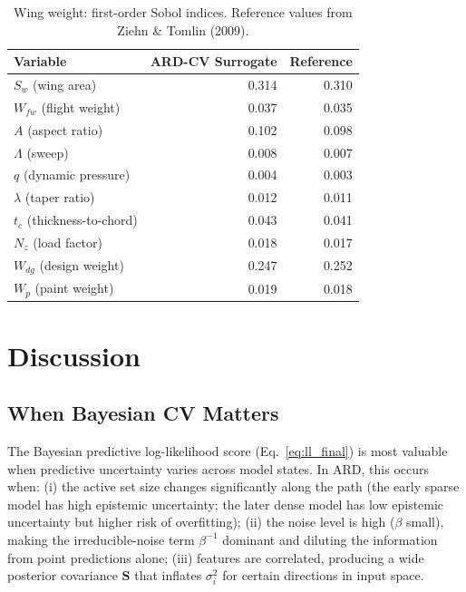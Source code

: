 \documentclass[11pt,a4paper]{article}
\begin{document}
\begin{table}[H]
\centering
\caption{Wing weight: first-order Sobol indices. Reference values from Ziehn \& Tomlin (2009).}
\label{tab:wing_sobol}
\begin{tabular}{@{}lrr@{}}
\toprule
Variable & ARD-CV Surrogate & Reference \\
\midrule
$S_w$ (wing area) & 0.314 & 0.310 \\
$W_{fw}$ (flight weight) & 0.037 & 0.035 \\
$A$ (aspect ratio) & 0.102 & 0.098 \\
$\Lambda$ (sweep) & 0.008 & 0.007 \\
$q$ (dynamic pressure) & 0.004 & 0.003 \\
$\lambda$ (taper ratio) & 0.012 & 0.011 \\
$t_c$ (thickness-to-chord) & 0.043 & 0.041 \\
$N_z$ (load factor) & 0.018 & 0.017 \\
$W_{dg}$ (design weight) & 0.247 & 0.252 \\
$W_p$ (paint weight) & 0.019 & 0.018 \\
\bottomrule
\end{tabular}
\end{table}

\section{Discussion}

\subsection{When Bayesian CV Matters}

The Bayesian predictive log-likelihood score (Eq.~\ref{eq:ll_final}) is most valuable when predictive uncertainty varies across model states. In ARD, this occurs when: (i) the active set size changes significantly along the path (the early sparse model has high epistemic uncertainty; the later dense model has low epistemic uncertainty but higher risk of overfitting); (ii) the noise level is high ($\beta$ small), making the irreducible-noise term $\beta^{-1}$ dominant and diluting the information from point predictions alone; (iii) features are correlated, producing a wide posterior covariance $\mathbf{S}$ that inflates $\sigma_i^2$ for certain directions in input space.
\end{document}
